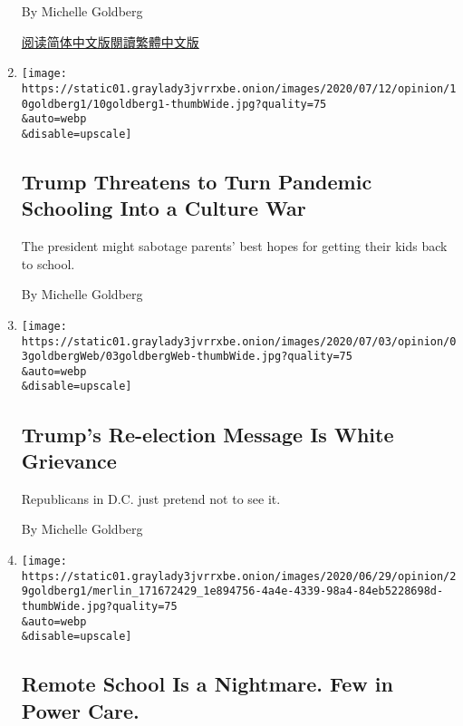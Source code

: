 \begin{enumerate}
  By Michelle Goldberg

  \href{https://cn.nytimes3xbfgragh.onion/opinion/20200714/us-coronavirus-trump/}{阅读简体中文版}\href{https://cn.nytimes3xbfgragh.onion/opinion/20200714/us-coronavirus-trump/zh-hant/}{閱讀繁體中文版}
\item
  \href{/2020/07/10/opinion/sunday/school-reopenings-trump.html}{}

  \texttt{[image: https://static01.graylady3jvrrxbe.onion/images/2020/07/12/opinion/10goldberg1/10goldberg1-thumbWide.jpg?quality=75\\\&auto=webp\\\&disable=upscale]}

  \hypertarget{trump-threatens-to-turn-pandemic-schooling-into-a-culture-war}{%
  \subsection{Trump Threatens to Turn Pandemic Schooling Into a Culture
  War}\label{trump-threatens-to-turn-pandemic-schooling-into-a-culture-war}}

  The president might sabotage parents' best hopes for getting their
  kids back to school.

  By Michelle Goldberg
\item
  \href{/2020/07/02/opinion/trump-racism-2020-election.html}{}

  \texttt{[image: https://static01.graylady3jvrrxbe.onion/images/2020/07/03/opinion/03goldbergWeb/03goldbergWeb-thumbWide.jpg?quality=75\\\&auto=webp\\\&disable=upscale]}

  \hypertarget{trumps-re-election-message-is-white-grievance}{%
  \subsection{Trump's Re-election Message Is White
  Grievance}\label{trumps-re-election-message-is-white-grievance}}

  Republicans in D.C. just pretend not to see it.

  By Michelle Goldberg
\item
  \href{/2020/06/29/opinion/coronavirus-school-reopening.html}{}

  \texttt{[image: https://static01.graylady3jvrrxbe.onion/images/2020/06/29/opinion/29goldberg1/merlin\_171672429\_1e894756-4a4e-4339-98a4-84eb5228698d-thumbWide.jpg?quality=75\\\&auto=webp\\\&disable=upscale]}

  \hypertarget{remote-school-is-a-nightmare-few-in-power-care}{%
  \subsection{Remote School Is a Nightmare. Few in Power
  Care.}\label{remote-school-is-a-nightmare-few-in-power-care}}


\end{enumerate}
